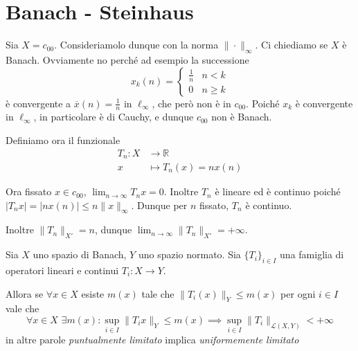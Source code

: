 \section{Banach \-- Steinhaus}
Sia \(X = c_{00}\). Consideriamolo dunque con la norma \(\|\cdot \|_{\infty}\).
Ci chiediamo se \(X\) è Banach. Ovviamente no perché ad esempio la successione 
\[
  x_k{(n)} = \begin{cases}{}
      \frac{1}{n} & n < k \\
      0 & n \ge k
  \end{cases}
\]
è convergente a \(\overline{x}{(n)} = \frac{1}{n}\) in \(\ell_{\infty} \), che
però non è in \(c_{00}\). Poiché \(x_k\) è convergente in \(\ell_{\infty}\), in
particolare è di Cauchy, e dunque \(c_{00} \) non è Banach.

Definiamo ora il funzionale
\begin{align*}
    T_{n}: X &\longrightarrow \mathbb{R} \\
    x &\longmapsto T_{n}(x) = n x{(n)}
\end{align*}

Ora fissato \(x \in c_{00}\), \(\lim_{n \to \infty} T_n x = 0\). Inoltre \(T_{n}\) è lineare ed è continuo poiché \(|T_n x | = | n x {(n)} | \le n \|x\|_{\infty} \). Dunque per \(
n\) fissato, \(T_n\) è continuo.

Inoltre \(\|T_{n}\|_{X'} = n \), dunque \(\lim_{n \to \infty} \|T_{n}\|_{X'} = +
\infty\).

\begin{theorem}
    Sia \(X\) uno spazio di Banach, \( Y\) uno spazio normato. Sia \(\{T_{i}\}_{i \in I} \) 
    una famiglia di operatori lineari e continui \(T_{i} : X \to Y\).

    Allora se \(\forall x \in X\) esiste \(m {(x)}\) tale che \(\|T_{i}{(x)}\|_Y \le m {(x)}\) per ogni \(i \in I\) vale che 
    \[
      \forall x \in X \,\, \exists m {(x)} : \sup_{i \in I}\|T_{i} x \|_Y \le  m {(x)} \implies \sup_{i \in I} \|T_{i}\|_{\mathcal{L}{(X, Y)}} < +\infty
    \]
    in altre parole \emph{puntualmente limitato} implica \emph{uniformemente
    limitato}
\end{theorem}

